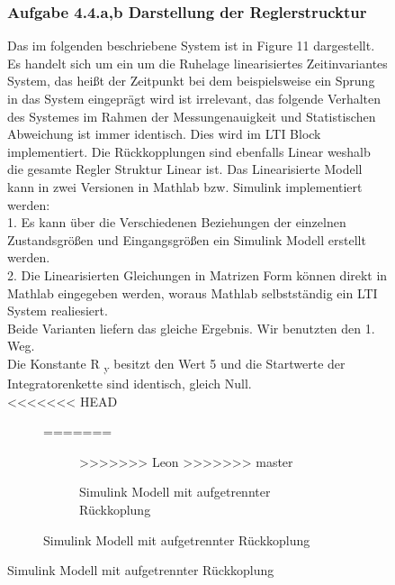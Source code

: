 \documentclass[10pt]{scrartcl}
\begin{document}
\begin{figure}[H]
\subsubsection{Aufgabe 4.4.a,b Darstellung der Reglerstrucktur}	
Das im folgenden beschriebene System ist in Figure 11 dargestellt. 
Es handelt sich um ein um die Ruhelage linearisiertes Zeitinvariantes System, das heißt der Zeitpunkt bei dem beispielsweise ein Sprung in das System eingeprägt wird ist irrelevant, das folgende Verhalten des Systemes im Rahmen der Messungenauigkeit und Statistischen Abweichung ist immer identisch. Dies wird im LTI Block implementiert. Die Rückkopplungen sind ebenfalls Linear weshalb die gesamte Regler Struktur Linear ist.
Das Linearisierte Modell kann in zwei Versionen in Mathlab bzw. Simulink implementiert werden:\\
1. Es kann über die Verschiedenen Beziehungen der einzelnen Zustandsgrößen und Eingangsgrößen ein Simulink Modell erstellt werden.\\
2. Die Linearisierten Gleichungen in Matrizen Form können direkt in Mathlab eingegeben werden, woraus Mathlab selbstständig ein LTI System realiesiert. \\
Beide Varianten liefern das gleiche Ergebnis.
Wir benutzten den 1. Weg. \\
Die Konstante R \textsubscript{y} besitzt den Wert 5 und die Startwerte der Integratorenkette sind identisch, gleich Null.\\
<<<<<<< HEAD
\begin{figure}  %
=======
\begin{figure} [H]
>>>>>>> Leon
>>>>>>> master
\caption{Simulink Modell mit aufgetrennter Rückkoplung} 
\end{figure}

\end{figure}
\end{figure}
\end{document}
